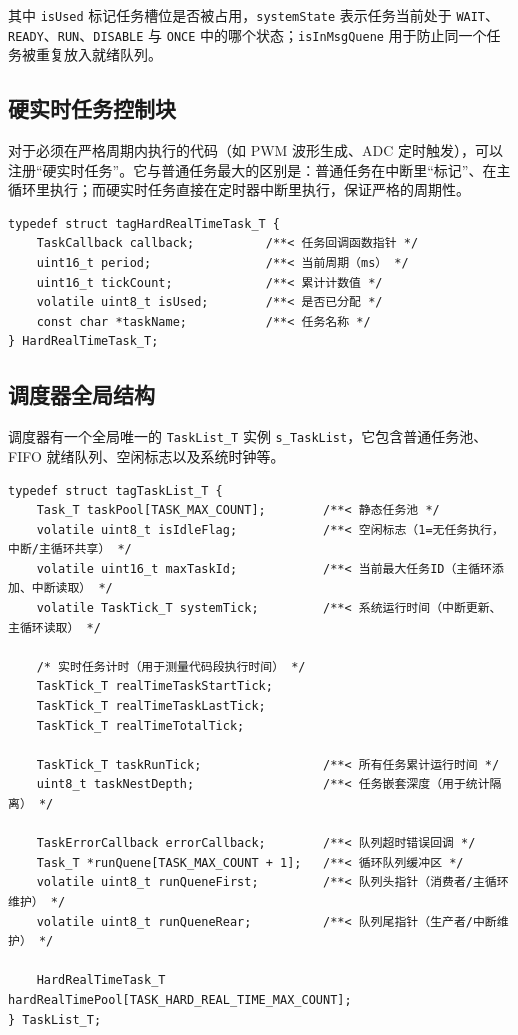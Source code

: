 其中 \texttt{isUsed} 标记任务槽位是否被占用，\texttt{systemState} 表示任务当前处于 \texttt{WAIT}、\texttt{READY}、\texttt{RUN}、\texttt{DISABLE} 与 \texttt{ONCE} 中的哪个状态；\texttt{isInMsgQuene} 用于防止同一个任务被重复放入就绪队列。

\subsection{硬实时任务控制块}

对于必须在严格周期内执行的代码（如 PWM 波形生成、ADC 定时触发），可以注册“硬实时任务”。它与普通任务最大的区别是：普通任务在中断里“标记”、在主循环里执行；而硬实时任务直接在定时器中断里执行，保证严格的周期性。

\begin{lstlisting}[style=c]
typedef struct tagHardRealTimeTask_T {
    TaskCallback callback;          /**< 任务回调函数指针 */
    uint16_t period;                /**< 当前周期（ms） */
    uint16_t tickCount;             /**< 累计计数值 */
    volatile uint8_t isUsed;        /**< 是否已分配 */
    const char *taskName;           /**< 任务名称 */
} HardRealTimeTask_T;
\end{lstlisting}

\subsection{调度器全局结构}

调度器有一个全局唯一的 \texttt{TaskList\_T} 实例 \texttt{s\_TaskList}，它包含普通任务池、 FIFO 就绪队列、空闲标志以及系统时钟等。

\begin{lstlisting}[style=c]
typedef struct tagTaskList_T {
    Task_T taskPool[TASK_MAX_COUNT];        /**< 静态任务池 */
    volatile uint8_t isIdleFlag;            /**< 空闲标志（1=无任务执行，中断/主循环共享） */
    volatile uint16_t maxTaskId;            /**< 当前最大任务ID（主循环添加、中断读取） */
    volatile TaskTick_T systemTick;         /**< 系统运行时间（中断更新、主循环读取） */

    /* 实时任务计时（用于测量代码段执行时间） */
    TaskTick_T realTimeTaskStartTick;
    TaskTick_T realTimeTaskLastTick;
    TaskTick_T realTimeTotalTick;

    TaskTick_T taskRunTick;                 /**< 所有任务累计运行时间 */
    uint8_t taskNestDepth;                  /**< 任务嵌套深度（用于统计隔离） */

    TaskErrorCallback errorCallback;        /**< 队列超时错误回调 */
    Task_T *runQuene[TASK_MAX_COUNT + 1];   /**< 循环队列缓冲区 */
    volatile uint8_t runQueneFirst;         /**< 队列头指针（消费者/主循环维护） */
    volatile uint8_t runQueneRear;          /**< 队列尾指针（生产者/中断维护） */

    HardRealTimeTask_T hardRealTimePool[TASK_HARD_REAL_TIME_MAX_COUNT];
} TaskList_T;
\end{lstlisting}

